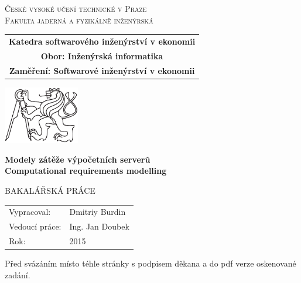 \documentclass[a4paper,12pt,twoside]{scrreprt}
\newcommand{\cvut}{České vysoké učení technické v Praze}
\newcommand{\fjfi}{Fakulta jaderná a fyzikálně inženýrská}
\newcommand{\kse}{Katedra softwarového inženýrství v ekonomii}
\newcommand{\obor}{Inženýrská informatika}
\newcommand{\zamereni}{Softwarové inženýrství v ekonomii}
\newcommand{\nazevcz}{Modely zátěže výpočetních serverů}        %
\newcommand{\nazeven}{Computational requirements modelling}     %
\newcommand{\autor}{Dmitriy Burdin}           %
\newcommand{\rok}{2015}          %
\newcommand{\vedouci}{Ing. Jan Doubek}         %
\newcommand{\druh}{BAKALÁŘSKÁ PRÁCE}
\begin{document}
\thispagestyle{empty}

\begin{center}
    {\Large \textsc{\cvut}\\[1.5ex] \textsc{\fjfi}}\\
    \vspace{10mm}

    \begin{tabular}{c}
	    {\bf \kse}\\   
      {\bf Obor: \obor}\\
      {\bf Zaměření: \zamereni}\\
    \end{tabular}

   \vspace{10mm} \includegraphics[height=25mm]{lev.pdf} \vspace{15mm}

   {\huge \bf \nazevcz}\\
   \vspace{5mm}   
   {\huge \bf \nazeven}
   
   \vspace{15mm}
   {\Large \druh}

   \vfill
   {\large
    \begin{tabular}{ll}
    Vypracoval: & \autor\\
    Vedoucí práce: & \vedouci\\
    Rok: & \rok
    \end{tabular}
   }
\end{center}

\newpage  %
\thispagestyle{empty} %

Před svázáním místo téhle stránky  s podpisem
děkana a do pdf verze oskenované zadání.
\end{document}
